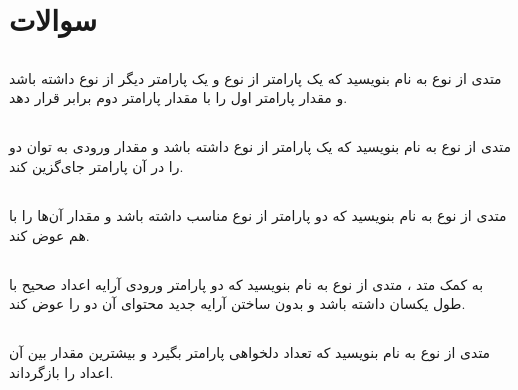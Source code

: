 \section{سوالات}
\RTL
    \subsection{\grayBox{\textcolor{purple}{C\#}}}
       متدی از نوع
       \grayBox{\textcolor{blue}{void}}
       به نام
        بنویسید که یک پارامتر از نوع
         \grayBox{\textcolor{blue}{out int}}
         و
         یک پارامتر دیگر از نوع
         \grayBox{\textcolor{blue}{int}}
         داشته باشد و مقدار پارامتر اول را با مقدار پارامتر دوم برابر قرار دهد.
      
    \subsection{\grayBox{\textcolor{purple}{C\#}}}
       متدی از نوع
       \grayBox{\textcolor{blue}{void}}
       به نام
        بنویسید که یک پارامتر از نوع
         \grayBox{\textcolor{blue}{int}}
          داشته باشد و مقدار ورودی به توان دو را در آن پارامتر جای‌گزین کند.
          
   \subsection{\grayBox{\textcolor{purple}{C\#}}}
     متدی از نوع
     \grayBox{\textcolor{blue}{void}}
      به نام
       بنویسید که دو پارامتر 
       \grayBox{\textcolor{blue}{int}}
       از نوع مناسب داشته باشد و مقدار آن‌ها را با هم عوض کند.
       
    \subsection{\grayBox{\textcolor{purple}{C\#}}}
     به کمک متد 
     ، متدی از نوع
     \grayBox{\textcolor{blue}{void}}
      به نام
       بنویسید که دو پارامتر ورودی آرایه اعداد صحیح با طول یکسان داشته باشد و بدون ساختن آرایه جدید محتوای آن دو را عوض کند.
       
    \subsection{\grayBox{\textcolor{purple}{C\#}}\grayBox{\textcolor{orange}{Python}}\grayBox{\textcolor{red}{C++}}\grayBox{\textcolor{green}{Java}}}
           متدی از نوع
           \grayBox{\textcolor{blue}{int}}
           به نام 
           	بنویسید که تعداد دلخواهی پارامتر
           	\grayBox{\textcolor{blue}{int}}
           	بگیرد و بیشترین مقدار بین آن اعداد را بازگرداند.
     

